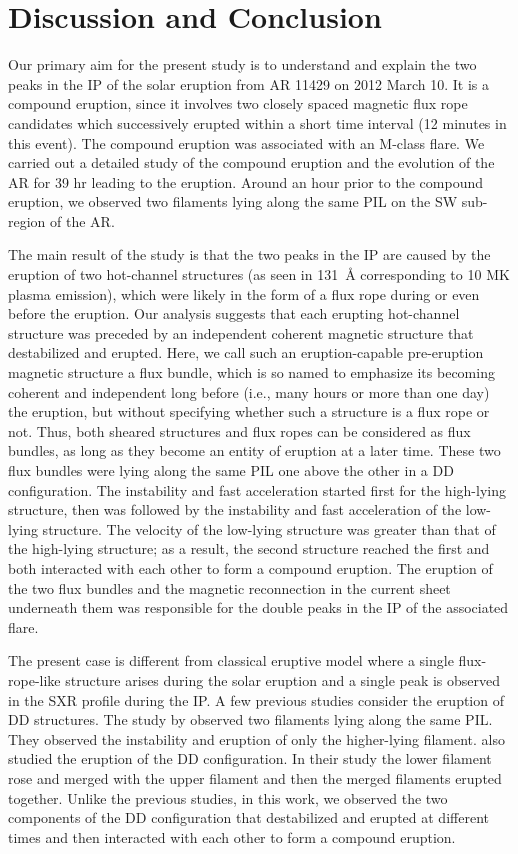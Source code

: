 \documentclass{aastex62}
\begin{document}
\section{\textbf{Discussion and Conclusion}}
\label{DC}

Our primary aim for the present study is to understand and explain the two peaks in the IP of the solar eruption from AR 11429 on 2012 March 10. It is a compound eruption, since it involves two closely spaced magnetic flux rope candidates which successively erupted within a short time interval (12 minutes in this event). The compound eruption was associated with an M-class flare. We carried out a detailed study of the compound eruption and the evolution of the AR for 39 hr leading to the eruption. Around an hour prior to the compound eruption, we observed two filaments lying along the same PIL on the SW sub-region of the AR.

The main result of the study is that the two peaks in the IP are caused by the eruption of two hot-channel structures (as seen in 131~\AA{} corresponding to 10 MK plasma emission), which were likely in the form of a flux rope during or even before the eruption. Our analysis suggests that each erupting hot-channel structure was preceded by an independent coherent magnetic structure that destabilized and erupted. Here, we call such an eruption-capable pre-eruption magnetic structure a flux bundle, which is so named to emphasize its becoming coherent and independent long before (i.e., many hours or more than one day) the eruption, but without specifying whether such a structure is a flux rope or not. Thus, both sheared structures and flux ropes can be considered as flux bundles, as long as they become an entity of eruption at a later time. These two flux bundles were lying along the same PIL one above the other in a DD configuration. The instability and fast acceleration started first for the high-lying structure, then was followed by the instability and fast acceleration of the low-lying structure. The velocity of the low-lying structure was greater than that of the high-lying structure; as a result, the second structure reached the first and both interacted with each other to form a compound eruption. The eruption of the two flux bundles and the magnetic reconnection in the current sheet underneath them was responsible for the double peaks in the IP of the associated flare.


The present case is different from classical eruptive model where a single flux-rope-like structure arises during the solar eruption and a single peak is observed in the SXR profile during the IP. A few previous studies consider the eruption of DD structures. The study by \citet{Liu_etal_2012} observed two filaments lying along the same PIL. They observed the instability and eruption of only the higher-lying filament. \citet{Zhu_etal_2015} also studied the eruption of the DD configuration. In their study the lower filament rose and merged with the upper filament and then the merged filaments erupted together. Unlike the previous studies, in this work, we observed the two components of the DD configuration that destabilized and erupted at different times and then interacted with each other to form a compound eruption. 
\end{document}
